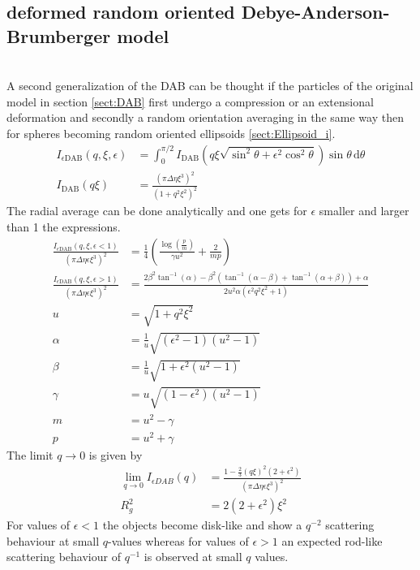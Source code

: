 \subsection{deformed random oriented Debye-Anderson-Brumberger model}
\label{sect:epsilonDAB}~\\
A second generalization of the DAB can be thought if the particles of the original model in section \ref{sect:DAB} first undergo a compression or an extensional deformation and secondly a random orientation averaging in the same way then for spheres becoming random oriented ellipsoids \ref{sect:Ellipsoid_i}. 
\begin{align}
   \label{eq:DABaffPLUSrnd}
  I_{\epsilon\mathrm{DAB}}(q,\xi,\epsilon) &= \int_0^{\pi/2}I_\mathrm{DAB}\left(q\xi\sqrt{\sin^2\theta+\epsilon^2\cos^2\theta}\right) \sin\theta\, \mathrm{d}\theta \\
  I_\mathrm{DAB}(q\xi) &= \frac{\left(\pi\Delta\eta\xi^3\right)^2}{\left(1+q^2\xi^2\right)^2}
\end{align}
The radial average can be done analytically and one gets for $\epsilon$ smaller and larger than 1 the expressions.
\begin{align}\label{eq:DABaffPLUSrnd_eps_small}
   \frac{I_{\epsilon\mathrm{DAB}}(q,\xi,\epsilon{<}1)}{\left(\pi\Delta\eta\epsilon\xi^3\right)^2} &=\frac{1}{4} \left(\frac{\log \left(\frac{p}{m}\right)}{\gamma  u^2}+\frac{2}{m p}\right) \\
   \frac{I_{\epsilon\mathrm{DAB}}(q,\xi,\epsilon{>}1)}{\left(\pi\Delta\eta\epsilon\xi^3\right)^2} &= \frac{2 \beta^2 \tan ^{-1}(\alpha)-\beta^2 \left(\tan ^{-1}(\alpha{-}\beta)+\tan ^{-1}(\alpha{+}\beta)\right)+\alpha}{2 u^2\alpha \left(
   \epsilon ^2 q^2 \xi ^2+1\right)} \\
   u &= \sqrt{1+q^2\xi^2} \\
  \alpha & =\frac{1}{u} \sqrt{\left(\epsilon^2-1\right)\left(u^2-1\right)}\\
  \beta &=  \frac{1}{u}\sqrt{1+\epsilon^2\left(u^2-1\right)}\\
  \gamma &= u\sqrt{\left(1-\epsilon^2\right)\left(u^2-1\right)} \\
  m &=u^2-\gamma \\
  p &= u^2+\gamma
\end{align}
The limit $q\to 0$ is given by
\begin{align}
  \lim_{q\to 0} I_{\epsilon DAB}(q)& = \frac{1 - \frac23 (q\xi)^2(2+\epsilon^2)}{\left(\pi\Delta\eta\epsilon\xi^3\right)^2} \\
  R_g^2 & =  2(2+\epsilon^2)\xi^2
\end{align}
For values of $\epsilon<1$ the objects become disk-like and show a $q^{-2}$ scattering behaviour at small $q$-values whereas for values of $\epsilon>1$ an expected rod-like scattering behaviour of $q^{-1}$ is observed at small $q$ values.
\clearpage
